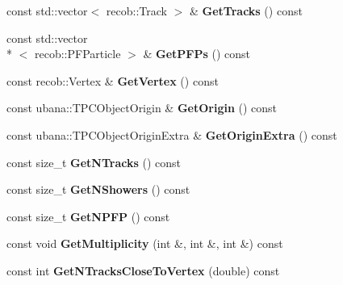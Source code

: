 \begin{DoxyCompactItemize}
\item 
\hypertarget{classubana_1_1TPCObject_a44cc29b00093d89d9f7fe834570d77be}{const std\-::vector$<$ recob\-::\-Track $>$ \& {\bfseries Get\-Tracks} () const }\label{classubana_1_1TPCObject_a44cc29b00093d89d9f7fe834570d77be}

\item 
\hypertarget{classubana_1_1TPCObject_a98af6b4a96031938afd18c372cd9d6d6}{const std\-::vector\\*
$<$ recob\-::\-P\-F\-Particle $>$ \& {\bfseries Get\-P\-F\-Ps} () const }\label{classubana_1_1TPCObject_a98af6b4a96031938afd18c372cd9d6d6}

\item 
\hypertarget{classubana_1_1TPCObject_a3845ae1b31ab6590c5597d157dc01e6a}{const recob\-::\-Vertex \& {\bfseries Get\-Vertex} () const }\label{classubana_1_1TPCObject_a3845ae1b31ab6590c5597d157dc01e6a}

\item 
\hypertarget{classubana_1_1TPCObject_a253b4e844b4de1333fa80263c03fceb7}{const ubana\-::\-T\-P\-C\-Object\-Origin \& {\bfseries Get\-Origin} () const }\label{classubana_1_1TPCObject_a253b4e844b4de1333fa80263c03fceb7}

\item 
\hypertarget{classubana_1_1TPCObject_a8060105ac9e5d4f3bc88b90695c38c95}{const ubana\-::\-T\-P\-C\-Object\-Origin\-Extra \& {\bfseries Get\-Origin\-Extra} () const }\label{classubana_1_1TPCObject_a8060105ac9e5d4f3bc88b90695c38c95}

\item 
\hypertarget{classubana_1_1TPCObject_af083d0e6577c431c1787eb46d313110b}{const size\-\_\-t {\bfseries Get\-N\-Tracks} () const }\label{classubana_1_1TPCObject_af083d0e6577c431c1787eb46d313110b}

\item 
\hypertarget{classubana_1_1TPCObject_a988b385655d32acd03121089058d49c4}{const size\-\_\-t {\bfseries Get\-N\-Showers} () const }\label{classubana_1_1TPCObject_a988b385655d32acd03121089058d49c4}

\item 
\hypertarget{classubana_1_1TPCObject_a5ec2d5ffe50fe31e05d5d1c4fd486df6}{const size\-\_\-t {\bfseries Get\-N\-P\-F\-P} () const }\label{classubana_1_1TPCObject_a5ec2d5ffe50fe31e05d5d1c4fd486df6}

\item 
\hypertarget{classubana_1_1TPCObject_a7c83c2331680f657d7fdcee1298e541b}{const void {\bfseries Get\-Multiplicity} (int \&, int \&, int \&) const }\label{classubana_1_1TPCObject_a7c83c2331680f657d7fdcee1298e541b}

\item 
\hypertarget{classubana_1_1TPCObject_aad6393ccb8f6b6e4ba6f36f790729c0b}{const int {\bfseries Get\-N\-Tracks\-Close\-To\-Vertex} (double) const }\label{classubana_1_1TPCObject_aad6393ccb8f6b6e4ba6f36f790729c0b}

\end{DoxyCompactItemize}


